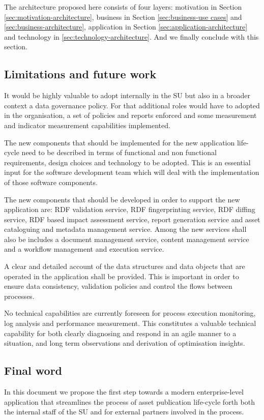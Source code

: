 	The architecture proposed here consists of four layers: motivation in Section \ref{sec:motivation-architecture}, business in Section \ref{sec:business-use cases} and \ref{sec:business-architecture}, application in Section \ref{sec:application-architecture} and technology in \ref{sec:technology-architecture}. And we finally conclude with this section.
	
	\subsection{Limitations and future work}
	
	It would be highly valuable to adopt internally in the SU but also in a broader context a data governance policy. For that additional roles would have to adopted in the organisation, a set of policies and reports enforced and some measurement and indicator measurement capabilities implemented. 
	
	The new components that should be implemented for the new application life-cycle need to be described in terms of functional and non functional requirements, design choices and technology to be adopted. This is an essential input for the software development team which will deal with the implementation of those software components. 
	
	The new components that should be developed in order to support the new application are: RDF validation service, RDF fingerprinting service, RDF diffing service, RDF based impact assessment service, report generation service and asset cataloguing and metadata management service. Among the new services shall also be includes a document management service, content management service and a workflow management and execution service. 
	
	A clear and detailed account of the data structures and data objects that are operated in the application shall be provided. This is important in order to ensure data consistency, validation policies and control the flows between processes. 
	
	No technical capabilities are currently foreseen for process execution monitoring, log analysis and performance measurement. This constitutes a valuable technical capability for both clearly diagnosing and respond in an agile manner to a situation, and long term observations and derivation of optimisation insights.
	
    \subsection{Final word}
    In this document we propose the first step towards a modern enterprise-level application that streamlines the process of asset publication life-cycle forth both the internal staff of the SU and for external partners involved in the process. 
    
